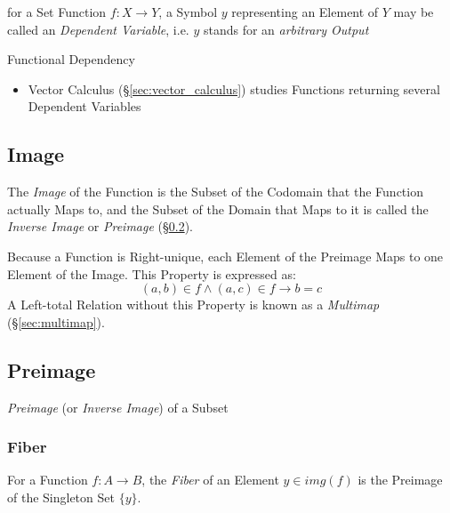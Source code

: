 for a Set Function $f : X \to Y$, a Symbol $y$ representing an Element
of $Y$ may be called an \emph{Dependent Variable}, i.e. $y$ stands for an
\emph{arbitrary Output}

Functional Dependency %

\begin{itemize}
  \item Vector Calculus (\S\ref{sec:vector_calculus}) studies
    Functions returning several Dependent Variables
\end{itemize}



\subsection{Image}\label{sec:image}

The \emph{Image} of the Function is the Subset of the Codomain that
the Function actually Maps to, and the Subset of the Domain that Maps
to it is called the \emph{Inverse Image} or \emph{Preimage}
(\S\ref{sec:preimage}).

Because a Function is Right-unique, each Element of the Preimage Maps
to one Element of the Image. This Property is expressed as:
\[
  (a,b) \in f \wedge (a,c) \in f \to b = c
\]
A Left-total Relation without this Property is known as a
\emph{Multimap} (\S\ref{sec:multimap}).



\subsection{Preimage}\label{sec:preimage}

\emph{Preimage} (or \emph{Inverse Image}) of a Subset



\subsubsection{Fiber}\label{sec:fiber}

For a Function $f : A \to B$, the \emph{Fiber} of an Element
$y \in img(f)$ is the Preimage of the Singleton Set $\{y\}$.

